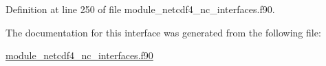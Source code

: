 Definition at line 250 of file module\+\_\+netcdf4\+\_\+nc\+\_\+interfaces.\+f90.



The documentation for this interface was generated from the following file\+:\begin{DoxyCompactItemize}
\item 
\hyperlink{module__netcdf4__nc__interfaces_8f90}{module\+\_\+netcdf4\+\_\+nc\+\_\+interfaces.\+f90}\end{DoxyCompactItemize}
